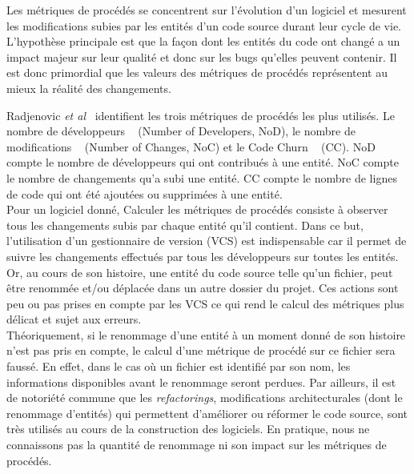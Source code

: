 Les métriques de procédés se concentrent sur l'évolution d'un logiciel et mesurent les modifications subies par les entités d'un code source durant leur cycle de vie. L'hypothèse principale est que la façon dont les entités du code ont changé a un impact majeur sur leur qualité et donc sur les bugs qu'elles peuvent contenir. Il est donc primordial que les valeurs des métriques de procédés représentent au mieux la réalité des changements.

Radjenovic \emph{et al}~\cite{radjenovic_software_2013} identifient les trois métriques de procédés les plus utilisés. Le nombre de développeurs ~\cite{weyuker_too_2008} (Number of Developers, NoD), le nombre de modifications ~\cite{graves_predicting_2000} (Number of Changes, NoC) et le Code Churn ~\cite{munson_code_1998} (CC). NoD compte le nombre de développeurs qui ont contribués à une entité. NoC compte le nombre de changements qu'a subi une entité. CC compte le nombre de lignes de code qui ont été ajoutées ou supprimées à une entité.\\

Pour un logiciel donné, Calculer les métriques de procédés consiste à observer tous les changements subis par chaque entité qu'il contient. Dans ce but, l'utilisation d'un gestionnaire de version (VCS) est indispensable car il permet de suivre les changements effectués par tous les développeurs sur toutes les entités.\\ 

Or, au cours de son histoire, une entité du code source telle qu'un fichier, peut être renommée et/ou déplacée dans un autre dossier du projet. Ces actions sont peu ou pas prises en compte par les VCS ce qui rend le calcul des métriques plus délicat et sujet aux erreurs.\\

Théoriquement, si le renommage d'une entité à un moment donné de son histoire n'est pas pris en compte, le calcul d'une métrique de procédé sur ce fichier sera faussé. En effet, dans le cas où un fichier est identifié par son nom, les informations disponibles avant le renommage seront perdues. Par ailleurs, il est de notoriété commune que les \textit{refactorings}, modifications architecturales (dont le renommage d'entités) qui permettent d'améliorer ou réformer le code source, sont très utilisés au cours de la construction des logiciels. En pratique, nous ne connaissons pas la quantité de renommage ni son impact sur les métriques de procédés.\\

